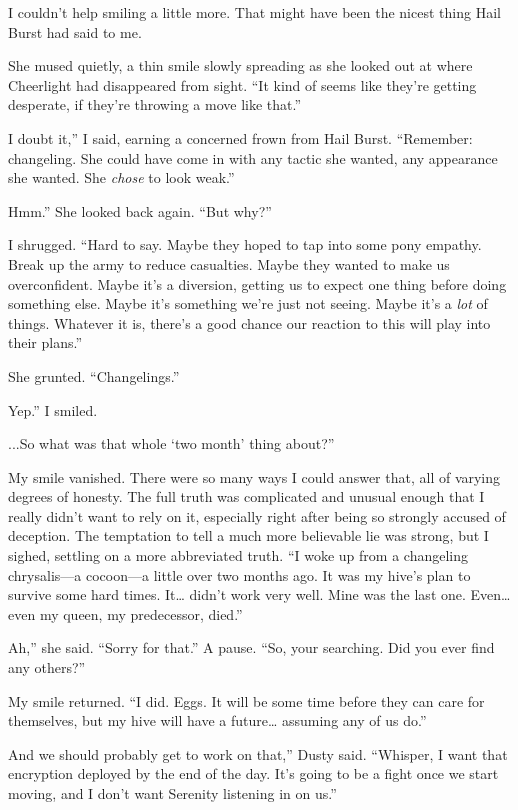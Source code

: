 I couldn’t help smiling a little more. That might have been the nicest thing Hail Burst had said to me.

She mused quietly, a thin smile slowly spreading as she looked out at where Cheerlight had disappeared from sight. “It kind of seems like they’re getting desperate, if they’re throwing a move like that.”

\leavevmode{}I doubt it,” I said, earning a concerned frown from Hail Burst. “Remember: changeling. She could have come in with any tactic she wanted, any appearance she wanted. She \textit{chose} to look weak.”

\leavevmode{}Hmm.” She looked back again. “But why?”

I shrugged. “Hard to say. Maybe they hoped to tap into some pony empathy. Break up the army to reduce casualties. Maybe they wanted to make us overconfident. Maybe it’s a diversion, getting us to expect one thing before doing something else. Maybe it’s something we’re just not seeing. Maybe it’s a \textit{lot} of things. Whatever it is, there’s a good chance our reaction to this will play into their plans.”

She grunted. “Changelings.”

\leavevmode{}Yep.” I smiled.

\leavevmode{}...So what was that whole ‘two month’ thing about?”

My smile vanished. There were so many ways I could answer that, all of varying degrees of honesty. The full truth was complicated and unusual enough that I really didn’t want to rely on it, especially right after being so strongly accused of deception. The temptation to tell a much more believable lie was strong, but I sighed, settling on a more abbreviated truth. “I woke up from a changeling chrysalis—a cocoon—a little over two months ago. It was my hive’s plan to survive some hard times. It… didn’t work very well. Mine was the last one. Even… even my queen, my predecessor, died.”

\leavevmode{}Ah,” she said. “Sorry for that.” A pause. “So, your searching. Did you ever find any others?”

My smile returned. “I did. Eggs. It will be some time before they can care for themselves, but my hive will have a future… assuming any of us do.”

\leavevmode{}And we should probably get to work on that,” Dusty said. “Whisper, I want that encryption deployed by the end of the day. It’s going to be a fight once we start moving, and I don’t want Serenity listening in on us.”


